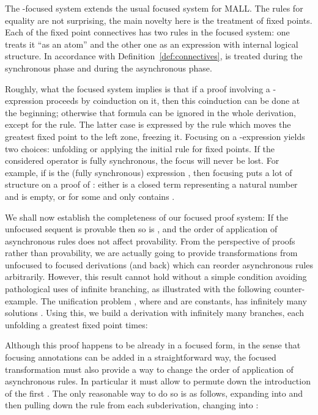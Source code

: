 The -focused system extends the usual focused system for MALL.
The rules for equality are not surprising,
the main novelty here is the treatment of fixed points.
Each of the fixed point connectives has two rules in the focused 
system:  one treats it ``as an atom'' and the other one as an expression with
internal logical structure.
In accordance with Definition~\ref{def:connectives},
 is treated during the synchronous phase
and  during the asynchronous phase.

Roughly, what the focused system implies is that
if a proof involving a -expression
proceeds by coinduction on it, then this coinduction can be done at the 
beginning;
otherwise that formula can be ignored in the whole derivation,
except for the  rule.
The latter case is expressed by the rule which moves the greatest fixed
point to the left zone, freezing it.
Focusing on a -expression yields two choices: unfolding or applying the 
initial rule for fixed points.
If the considered operator is fully synchronous, the focus will never be lost.
For example, if  is the (fully synchronous) expression
,
then focusing puts a lot of structure on a proof of
: 
either  is a closed term representing a natural number and  is empty,
or  for some  and  only contains .

We shall now establish the completeness of our focused proof system:
If the unfocused sequent  is provable then so is
, and the order of application of asynchronous
rules does not affect provability.
From the perspective of proofs rather than provability,
we are actually going to provide transformations from unfocused to focused
derivations (and back) which can reorder asynchronous rules arbitrarily.
However, this result cannot hold without a simple condition
avoiding pathological uses of infinite branching, as illustrated with
the following counter-example.
The unification problem , where  and  are constants,
has infinitely many solutions .
Using this, we build a derivation 
with infinitely many branches, each 
unfolding a greatest fixed point  times:

 
Although this proof happens to be already in a focused form,
in the sense that focusing annotations can be added in a straightforward
way,
the focused transformation must also provide a way to change the order
of application of asynchronous rules.
In particular it must allow to permute down the introduction of
the first . The only reasonable way to do so is as follows,
expanding  into  and then pulling down the  rule
from each subderivation, changing  into :

